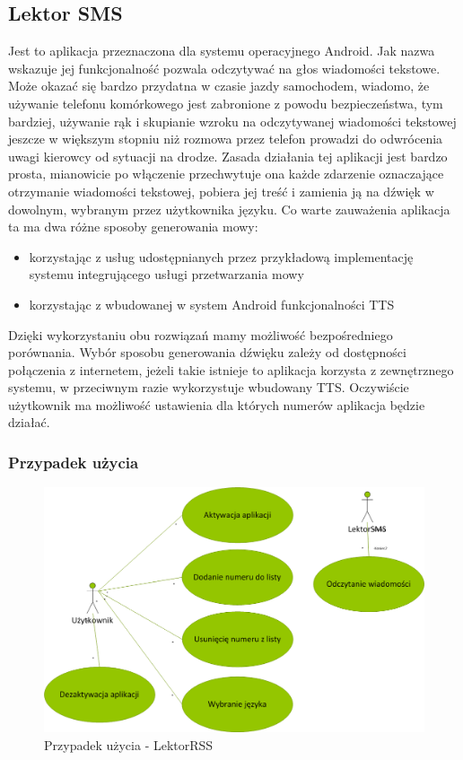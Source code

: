 \subsection{Lektor SMS}
Jest to aplikacja przeznaczona dla systemu operacyjnego Android. Jak nazwa wskazuje jej funkcjonalność pozwala odczytywać na głos wiadomości tekstowe. Może okazać się bardzo przydatna w czasie jazdy samochodem, wiadomo, że używanie telefonu komórkowego jest zabronione z powodu bezpieczeństwa, tym bardziej, używanie rąk i skupianie wzroku na odczytywanej wiadomości tekstowej jeszcze w większym stopniu niż rozmowa przez telefon prowadzi do odwrócenia uwagi kierowcy od sytuacji na drodze.
Zasada działania tej aplikacji jest bardzo prosta, mianowicie po włączenie przechwytuje ona każde zdarzenie oznaczające otrzymanie wiadomości tekstowej, pobiera jej treść i zamienia ją na dźwięk w dowolnym, wybranym przez użytkownika języku. Co warte zauważenia aplikacja ta ma dwa różne sposoby generowania mowy:
\begin{itemize}
	\item korzystając z usług udostępnianych przez przykładową implementację systemu integrującego usługi przetwarzania mowy
	\item korzystając z wbudowanej w system Android funkcjonalności TTS
\end{itemize} 
Dzięki wykorzystaniu obu rozwiązań mamy możliwość bezpośredniego porównania. Wybór sposobu generowania dźwięku zależy od dostępności połączenia z internetem, jeżeli takie istnieje to aplikacja korzysta z zewnętrznego systemu, w przeciwnym razie wykorzystuje wbudowany TTS. Oczywiście użytkownik ma możliwość ustawienia dla których numerów aplikacja będzie działać.
\newpage
\subsubsection{Przypadek użycia}
\begin{figure}[!h]
	\centering
	\includegraphics[scale=0.45]{useCaseLektorSMS.png} 
	\caption{Przypadek użycia - LektorRSS}
\end{figure}

